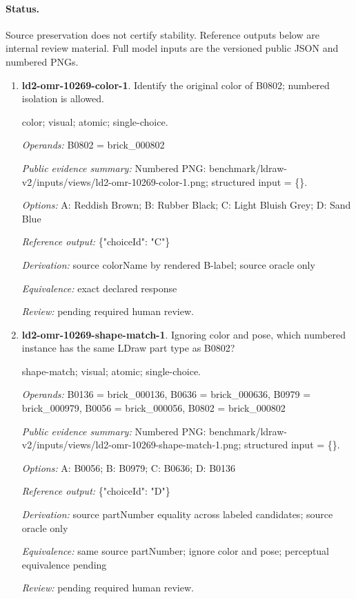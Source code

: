 \paragraph{Status.}Source preservation does not certify stability. Reference outputs below are internal review material. Full model inputs are the versioned public JSON and numbered PNGs.
\begin{enumerate}
\item \textbf{ld2-omr-10269-color-1}. Identify the original color of B0802; numbered isolation is allowed.
\par{\small color; visual; atomic; single-choice.\par\textit{Operands:} B0802 = brick\_000802\par\textit{Public evidence summary:} Numbered PNG: benchmark/ldraw-v2/inputs/views/ld2-omr-10269-color-1.png; structured input = \{\}.\par\textit{Options:} A: Reddish Brown; B: Rubber Black; C: Light Bluish Grey; D: Sand Blue\par\textit{Reference output:} \{"choiceId": "C"\}\par\textit{Derivation:} source colorName by rendered B-label; source oracle only\par\textit{Equivalence:} exact declared response\par\textit{Review:} pending required human review.}
\item \textbf{ld2-omr-10269-shape-match-1}. Ignoring color and pose, which numbered instance has the same LDraw part type as B0802?
\par{\small shape-match; visual; atomic; single-choice.\par\textit{Operands:} B0136 = brick\_000136, B0636 = brick\_000636, B0979 = brick\_000979, B0056 = brick\_000056, B0802 = brick\_000802\par\textit{Public evidence summary:} Numbered PNG: benchmark/ldraw-v2/inputs/views/ld2-omr-10269-shape-match-1.png; structured input = \{\}.\par\textit{Options:} A: B0056; B: B0979; C: B0636; D: B0136\par\textit{Reference output:} \{"choiceId": "D"\}\par\textit{Derivation:} source partNumber equality across labeled candidates; source oracle only\par\textit{Equivalence:} same source partNumber; ignore color and pose; perceptual equivalence pending\par\textit{Review:} pending required human review.}

\end{enumerate}

